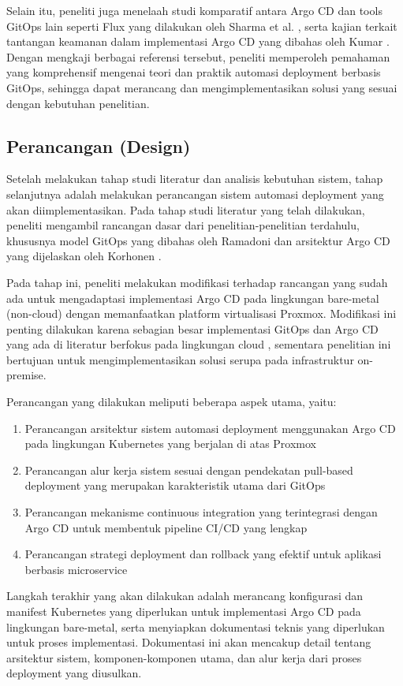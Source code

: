 Selain itu, peneliti juga menelaah studi komparatif antara Argo CD dan tools GitOps lain seperti Flux yang dilakukan oleh Sharma et al. \cite{Sharma2022},
serta kajian terkait tantangan keamanan dalam implementasi Argo CD yang dibahas oleh Kumar \cite{Kumar2023}. Dengan mengkaji berbagai referensi tersebut,
peneliti memperoleh pemahaman yang komprehensif mengenai teori dan praktik automasi deployment berbasis GitOps, sehingga dapat merancang dan mengimplementasikan solusi yang sesuai dengan kebutuhan penelitian.

\subsection{Perancangan (Design)}
Setelah melakukan tahap studi literatur dan analisis kebutuhan sistem, tahap selanjutnya adalah melakukan perancangan sistem automasi deployment yang akan diimplementasikan. Pada tahap studi literatur yang telah dilakukan, peneliti mengambil rancangan dasar dari penelitian-penelitian terdahulu, khususnya model GitOps yang dibahas oleh Ramadoni \cite{Ramadoni2021} dan arsitektur Argo CD yang dijelaskan oleh Korhonen \cite{Korhonen2021}.

Pada tahap ini, peneliti melakukan modifikasi terhadap rancangan yang sudah ada untuk mengadaptasi implementasi Argo CD pada lingkungan bare-metal (non-cloud) dengan memanfaatkan platform virtualisasi Proxmox. Modifikasi ini penting dilakukan karena sebagian besar implementasi GitOps dan Argo CD yang ada di literatur berfokus pada lingkungan cloud \cite{Bolscher2019}, sementara penelitian ini bertujuan untuk mengimplementasikan solusi serupa pada infrastruktur on-premise.

Perancangan yang dilakukan meliputi beberapa aspek utama, yaitu:

\begin{enumerate}
    \item Perancangan arsitektur sistem automasi deployment menggunakan Argo CD pada lingkungan Kubernetes yang berjalan di atas Proxmox
    \item Perancangan alur kerja sistem sesuai dengan pendekatan pull-based deployment yang merupakan karakteristik utama dari GitOps \cite{Weaveworks2017}
    \item Perancangan mekanisme continuous integration yang terintegrasi dengan Argo CD untuk membentuk pipeline CI/CD yang lengkap
    \item Perancangan strategi deployment dan rollback yang efektif untuk aplikasi berbasis microservice
\end{enumerate}

Langkah terakhir yang akan dilakukan adalah merancang konfigurasi dan manifest Kubernetes yang diperlukan untuk implementasi Argo CD pada lingkungan bare-metal, serta menyiapkan dokumentasi teknis yang diperlukan untuk proses implementasi. Dokumentasi ini akan mencakup detail tentang arsitektur sistem, komponen-komponen utama, dan alur kerja dari proses deployment yang diusulkan.
\newpage
